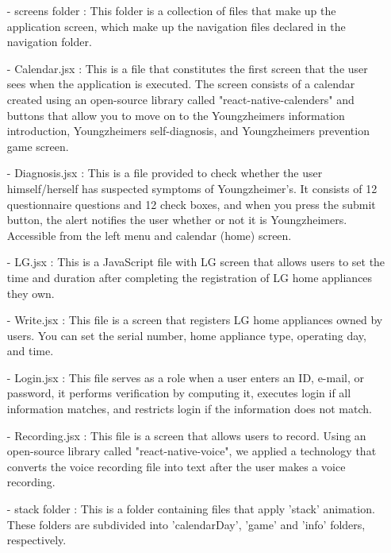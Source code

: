 \documentclass[conference]{IEEEtran}
\begin{document}
\begin{enumerate}
        \item[-] screens folder : This folder is a collection of files that make up the application screen, which make up the navigation files declared in the navigation folder. \\
        \item[-] Calendar.jsx : This is a file that constitutes the first screen that the user sees when the application is executed. The screen consists of a calendar created using an open-source library called "react-native-calenders" and buttons that allow you to move on to the Youngzheimers information introduction, Youngzheimers self-diagnosis, and Youngzheimers prevention game screen. \\
        \item[-] Diagnosis.jsx : This is a file provided to check whether the user himself/herself has suspected symptoms of Youngzheimer's. It consists of 12 questionnaire questions and 12 check boxes, and when you press the submit button, the alert notifies the user whether or not it is Youngzheimers. Accessible from the left menu and calendar (home) screen.  \\
        \item[-] LG.jsx : This is a JavaScript file with LG screen that allows users to set the time and duration after completing the registration of LG home appliances they own.\\
        \item[-] Write.jsx : This file is a screen that registers LG home appliances owned by users. You can set the serial number, home appliance type, operating day, and time.\\
        \item[-] Login.jsx : This file serves as a role when a user enters an ID, e-mail, or password, it performs verification by computing it, executes login if all information matches, and restricts login if the information does not match.\\
        \item [-] Recording.jsx : This file is a screen that allows users to record. Using an open-source library called "react-native-voice", we applied a technology that converts the voice recording file into text after the user makes a voice recording.\\
        \item[-] stack folder : This is a folder containing files that apply 'stack' animation. These folders are subdivided into 'calendarDay', 'game' and 'info' folders, respectively.\\

\end{enumerate}
\end{document}
